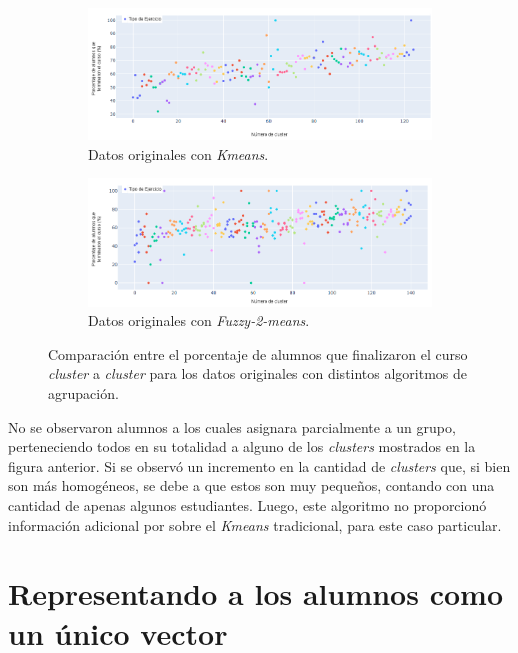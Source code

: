 \documentclass[11pt,a4paper,twoside,openany]{tesis}
\begin{document}
\begin{figure}[H]
    \centering
    \begin{subfigure}{0.45\textwidth}
        \includegraphics[width=\linewidth]{imagenes/porcentaje - original.png}
        \caption{Datos originales con \emph{Kmeans}.}
        \label{fig:figura5}
    \end{subfigure}
    \hfill
    \begin{subfigure}{0.45\textwidth}
        \includegraphics[width=\linewidth]{imagenes/porcentaje - fuzzy.png}
        \caption{Datos originales con \emph{Fuzzy-2-means}.}
        \label{fig:figura6}
    \end{subfigure}
    \caption{Comparación entre el porcentaje de alumnos que finalizaron el curso \emph{cluster} a \emph{cluster} para los datos originales con distintos algoritmos de agrupación.}
    \label{porcentajes}
\end{figure}

No se observaron alumnos a los cuales asignara parcialmente a un grupo, perteneciendo todos en su totalidad a alguno de los \emph{clusters} mostrados en la figura anterior. Si se observó un incremento en la cantidad de \emph{clusters} que, si bien son más homogéneos, se debe a que estos son muy pequeños, contando con una cantidad de apenas algunos estudiantes. Luego, este algoritmo no proporcionó información adicional por sobre el \emph{Kmeans} tradicional, para este caso particular.


\section{Representando a los alumnos como un único vector}
\end{document}
